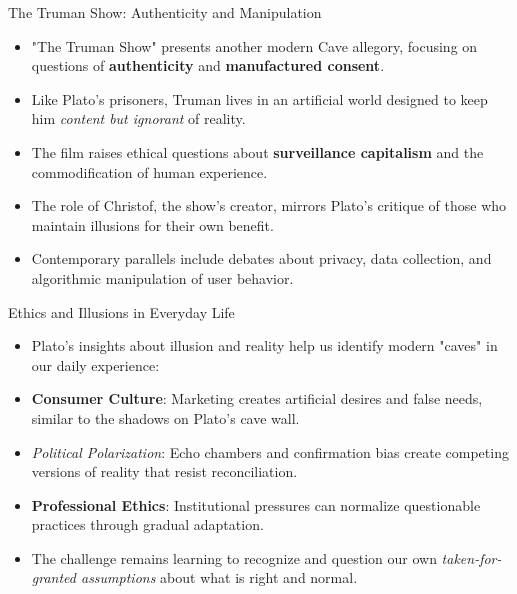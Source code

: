 \documentclass[aspectratio=169]{beamer}
\begin{document}
\begin{frame}{The Truman Show: Authenticity and Manipulation}
\begin{itemize}
\item "The Truman Show" presents another modern Cave allegory, focusing on questions of \textbf{authenticity} and \textbf{manufactured consent}.
\item Like Plato's prisoners, Truman lives in an artificial world designed to keep him \emph{content but ignorant} of reality.
\item The film raises ethical questions about \textbf{surveillance capitalism} and the commodification of human experience.
\item The role of Christof, the show's creator, mirrors Plato's critique of those who maintain illusions for their own benefit.
\item Contemporary parallels include debates about privacy, data collection, and algorithmic manipulation of user behavior.
\end{itemize}
\end{frame}

\begin{frame}{Ethics and Illusions in Everyday Life}
\begin{itemize}
\item Plato's insights about illusion and reality help us identify modern "caves" in our daily experience:
\item \textbf{Consumer Culture}: Marketing creates artificial desires and false needs, similar to the shadows on Plato's cave wall.
\item \emph{Political Polarization}: Echo chambers and confirmation bias create competing versions of reality that resist reconciliation.
\item \textbf{Professional Ethics}: Institutional pressures can normalize questionable practices through gradual adaptation.
\item The challenge remains learning to recognize and question our own \emph{taken-for-granted assumptions} about what is right and normal.
\end{itemize}
\end{frame}
\end{document}

